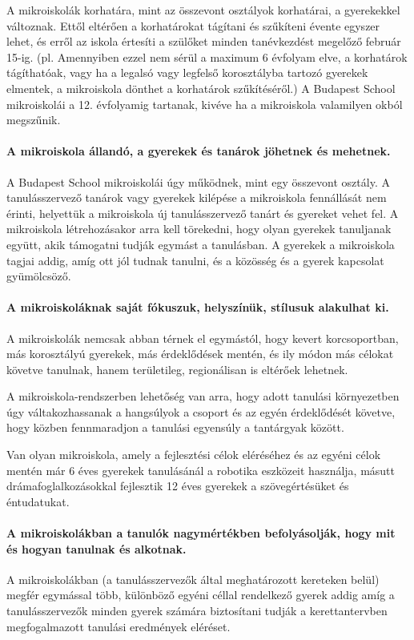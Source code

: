 A mikroiskolák korhatára, mint az összevont osztályok korhatárai, a gyerekekkel
változnak. Ettől eltérően a korhatárokat tágítani és szűkíteni évente egyszer
lehet, és
erről az iskola értesíti a szülőket minden tanévkezdést megelőző február 15-ig.
(pl. Amennyiben ezzel nem sérül a maximum 6 évfolyam elve, a korhatárok
tágíthatóak, vagy ha a legalsó vagy legfelső korosztályba tartozó gyerekek
elmentek, a mikroiskola dönthet a korhatárok szűkítéséről.)
A Budapest School mikroiskolái a 12. évfolyamig tartanak, kivéve ha a
mikroiskola valamilyen okból megszűnik.

\paragraph{A mikroiskola állandó, a gyerekek és tanárok jöhetnek és mehetnek.}
A Budapest School mikroiskolái úgy működnek, mint egy összevont osztály. A
tanulásszervező tanárok vagy gyerekek kilépése a mikroiskola fennállását nem
érinti, helyettük a mikroiskola új tanulásszervező tanárt és
gyereket vehet fel.  A mikroiskola létrehozásakor arra kell törekedni, hogy
olyan
gyerekek tanuljanak együtt, akik támogatni tudják egymást a tanulásban. A
gyerekek a mikroiskola tagjai addig, amíg ott jól tudnak tanulni, és a közösség
és a gyerek kapcsolat gyümölcsöző.

\paragraph{A mikroiskoláknak saját fókuszuk, helyszínük, stílusuk alakulhat
      ki.}
A mikroiskolák nemcsak abban térnek el egymástól, hogy kevert korcsoportban,
más korosztályú gyerekek, más érdeklődések mentén, és ily módon más célokat
követve tanulnak, hanem területileg, regionálisan is eltérőek lehetnek.

A mikroiskola-rendszerben lehetőség van arra, hogy adott tanulási környezetben
úgy váltakozhassanak a hangsúlyok a csoport és az egyén érdeklődését követve,
hogy közben
fennmaradjon a tanulási egyensúly a tantárgyak között.

Van olyan mikroiskola, amely a fejlesztési célok eléréséhez és az egyéni célok
mentén már 6 éves gyerekek tanulásánál a robotika eszközeit használja, másutt
drámafoglalkozásokkal fejlesztik 12 éves gyerekek a szövegértésüket és
éntudatukat.

\paragraph{A mikroiskolákban a tanulók nagymértékben befolyásolják, hogy mit és
      hogyan
      tanulnak és alkotnak.}
A mikroiskolákban (a tanulásszervezők által meghatározott kereteken belül)
megfér egymással több, különböző egyéni céllal rendelkező gyerek addig amíg a
tanulásszervezők minden gyerek számára biztosítani tudják a kerettantervben
megfogalmazott tanulási eredmények eléréset.

